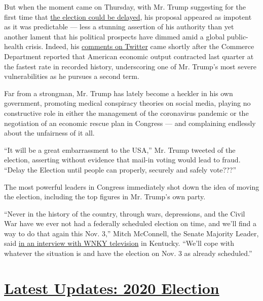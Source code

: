 But when the moment came on Thursday, with Mr. Trump suggesting for the
first time that
\href{https://www.nytimes3xbfgragh.onion/2020/07/31/us/politics/trump-tweet-democracy.html}{the
election could be delayed}, his proposal appeared as impotent as it was
predictable --- less a stunning assertion of his authority than yet
another lament that his political prospects have dimmed amid a global
public-health crisis. Indeed, his
\href{https://www.nytimes3xbfgragh.onion/2020/07/31/us/politics/trump-tweet-democracy.html}{comments
on Twitter} came shortly after the Commerce Department reported that
American economic output contracted last quarter at the fastest rate in
recorded history, underscoring one of Mr. Trump's most severe
vulnerabilities as he pursues a second term.

Far from a strongman, Mr. Trump has lately become a heckler in his own
government, promoting medical conspiracy theories on social media,
playing no constructive role in either the management of the coronavirus
pandemic or the negotiation of an economic rescue plan in Congress ---
and complaining endlessly about the unfairness of it all.

``It will be a great embarrassment to the USA,'' Mr. Trump tweeted of
the election, asserting without evidence that mail-in voting would lead
to fraud. ``Delay the Election until people can properly, securely and
safely vote???''

The most powerful leaders in Congress immediately shot down the idea of
moving the election, including the top figures in Mr. Trump's own party.

``Never in the history of the country, through wars, depressions, and
the Civil War have we ever not had a federally scheduled election on
time, and we'll find a way to do that again this Nov. 3,'' Mitch
McConnell, the Senate Majority Leader, said
\href{https://twitter.com/MaxWinitz/status/1288875891985129480?s=20}{in
an interview with WNKY television} in Kentucky. ``We'll cope with
whatever the situation is and have the election on Nov. 3 as already
scheduled.''

\hypertarget{latest-updates-2020-election}{%
\section{\texorpdfstring{\href{https://www.nytimes3xbfgragh.onion/2020/07/31/us/elections/biden-vs-trump.html?action=click\&pgtype=Article\&state=default\&region=MAIN_CONTENT_1\&context=storylines_live_updates}{Latest
Updates: 2020
Election}}{Latest Updates: 2020 Election}}\label{latest-updates-2020-election}}

